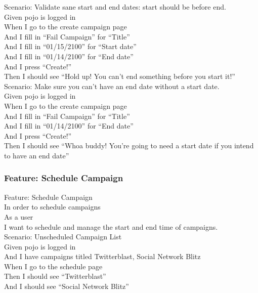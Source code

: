 \documentclass[12pt]{article}
\begin{document}
Scenario: Validate sane start and end dates: start should be before end. \\
  Given pojo is logged in \\
  When I go to the create campaign page \\
  And I fill in ``Fail Campaign'' for ``Title'' \\
  And I fill in ``01/15/2100'' for ``Start date'' \\
  And I fill in ``01/14/2100'' for ``End date'' \\
  And I press ``Create!'' \\
  Then I should see ``Hold up! You can't end something before you start it!'' \\

Scenario: Make sure you can't have an end date without a start date. \\
  Given pojo is logged in \\
  When I go to the create campaign page \\
  And I fill in ``Fail Campaign'' for ``Title'' \\
  And I fill in ``01/14/2100'' for ``End date'' \\
  And I press ``Create!'' \\
  Then I should see ``Whoa buddy! You're going to need a start date if you intend to have an end date'' \\

\subsubsection{Feature: Schedule Campaign}

Feature: Schedule Campaign \\
  In order to schedule campaigns \\
  As a user \\
  I want to schedule and manage the start and end time of campaigns. \\

Scenario: Unscheduled Campaign List \\
  Given pojo is logged in \\
  And I have campaigns titled Twitterblast, Social Network Blitz \\
  When I go to the schedule page \\
  Then I should see ``Twitterblast'' \\
  And I should see ``Social Network Blitz'' \\
\end{document}
